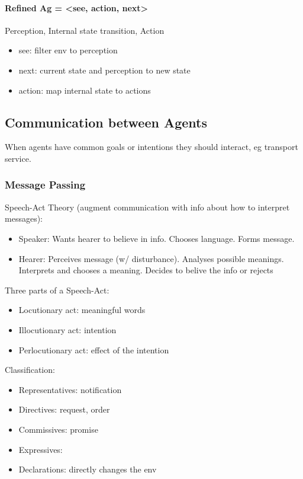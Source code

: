 \documentclass[ngerman]{scrartcl}
\begin{document}
\paragraph{Refined Ag = <see, action, next>} Perception, Internal state transition, Action
\begin{itemize}
    \item see: filter env to perception
    \item next: current state and perception to new state
    \item action: map internal state to actions
\end{itemize}

\subsection*{Communication between Agents}
When agents have common goals or intentions they should interact, eg transport service.
\subsubsection*{Message Passing} Speech-Act Theory (augment communication with info about how to interpret messages):
\begin{itemize}
    \item Speaker: Wants hearer to believe in info. Chooses language. Forms message.
    \item Hearer: Perceives message (w/ disturbance). Analyses possible meanings. Interprets and chooses a meaning. Decides to belive the info or rejects
\end{itemize}
Three parts of a Speech-Act:
\begin{itemize}
    \item Locutionary act: meaningful words
    \item Illocutionary act: intention
    \item Perlocutionary act: effect of the intention 
\end{itemize}
Classification:
\begin{itemize}
    \item Representatives: notification
    \item Directives: request, order
    \item Commissives: promise
    \item Expressives:
    \item Declarations: directly changes the env
\end{itemize}
\end{document}
